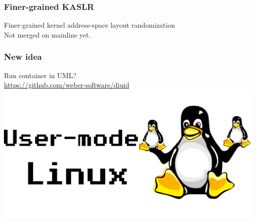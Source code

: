 \documentclass{beamer}
\begin{document}
\begin{CJK*}{UTF8}{bsmi}
    \begin{frame}
        \frametitle{Finer-grained KASLR}
        \centering
        Finer-grained kernel address-space layout randomization\cite{LWN_FGKASLR}\\
        \Large Not merged on mainline yet.
    \end{frame}

    \begin{frame}
        \frametitle{New idea}
        \centering Run container in UML?\\
        \url{https://github.com/weber-software/diuid}
        \includegraphics[width=\textwidth]{UML.png}
    \end{frame}


\end{CJK*}
\end{document}
